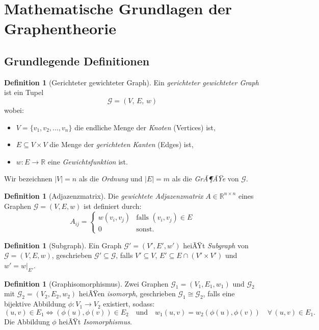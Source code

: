 ﻿\documentclass[12pt,a4paper]{article}
\theoremstyle{plain}
\theoremstyle{definition}
\newtheorem{definition}[theorem]{Definition}
\theoremstyle{remark}
\newcommand{\GG}{\mathcal{G}}
\newcommand{\RR}{\mathbb{R}}
\begin{document}
\section{Mathematische Grundlagen der Graphentheorie}
\label{sec:grundlagen}

\subsection{Grundlegende Definitionen}

\begin{definition}[Gerichteter gewichteter Graph]
\label{def:graph}
Ein \emph{gerichteter gewichteter Graph} ist ein Tupel
\[
  \GG = (V,\, E,\, w)
\]
wobei:
\begin{itemize}
  \item $V = \{v_1, v_2, \ldots, v_n\}$ die endliche Menge der \emph{Knoten} (Vertices) ist,
  \item $E \subseteq V \times V$ die Menge der \emph{gerichteten Kanten} (Edges) ist,
  \item $w : E \to \RR$ eine \emph{Gewichtsfunktion} ist.
\end{itemize}
Wir bezeichnen $|V| = n$ als die \emph{Ordnung} und $|E| = m$ als die \emph{GrÃ¶ÃŸe} von $\GG$.
\end{definition}

\begin{definition}[Adjazenzmatrix]
\label{def:adjazenz}
Die \emph{gewichtete Adjazenzmatrix} $A \in \RR^{n \times n}$ eines Graphen $\GG = (V, E, w)$ ist definiert durch:
\[
  A_{ij} = \begin{cases} w(v_i, v_j) & \text{falls } (v_i, v_j) \in E \\ 0 & \text{sonst.} \end{cases}
\]
\end{definition}

\begin{definition}[Subgraph]
\label{def:subgraph}
Ein Graph $\GG' = (V', E', w')$ heiÃŸt \emph{Subgraph} von $\GG = (V, E, w)$, geschrieben $\GG' \subseteq \GG$, falls $V' \subseteq V$, $E' \subseteq E \cap (V' \times V')$ und $w' = w|_{E'}$.
\end{definition}

\begin{definition}[Graphisomorphismus]
\label{def:isomorphismus}
Zwei Graphen $\GG_1 = (V_1, E_1, w_1)$ und $\GG_2$ mit $\GG_2 = (V_2, E_2, w_2)$ heiÃŸen \emph{isomorph}, geschrieben $\GG_1 \cong \GG_2$, falls eine bijektive Abbildung $\phi: V_1 \to V_2$ existiert, sodass:
\[
  (u,v) \in E_1 \iff (\phi(u), \phi(v)) \in E_2
  \quad \text{und} \quad
  w_1(u,v) = w_2(\phi(u), \phi(v)) \quad \forall\, (u,v) \in E_1.
\]
Die Abbildung $\phi$ heiÃŸt \emph{Isomorphismus}.
\end{definition}
\end{document}
